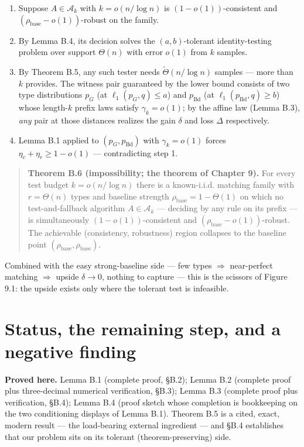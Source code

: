 \begin{enumerate}
\def\labelenumi{\arabic{enumi}.}
\tightlist
\item
  Suppose \(A\in\mathcal A_k\) with \(k=o(n/\log n)\) is
  \((1-o(1))\)-consistent and \((\rho_{\mathrm{base}}-o(1))\)-robust on
  the family.
\item
  By Lemma B.4, its decision solves the \((a,b)\)-tolerant
  identity-testing problem over support \(\Theta(n)\) with error
  \(o(1)\) from \(k\) samples.
\item
  By Theorem B.5, any such tester needs \(\tilde\Theta(n/\log n)\)
  samples --- more than \(k\) provides. The witness pair guaranteed by
  the lower bound consists of two type distributions \(p_G\) (at
  \(\ell_1(p_G,q)\le a\)) and \(p_{\mathrm{Bd}}\) (at
  \(\ell_1(p_{\mathrm{Bd}},q)\ge b\)) whose length-\(k\) prefix laws
  satisfy \(\gamma_k=o(1)\); by the affine law (Lemma B.3), \emph{any}
  pair at those distances realizes the gain \(\delta\) and loss
  \(\Delta\) respectively.
\item
  Lemma B.1 applied to \((p_G,p_{\mathrm{Bd}})\) with \(\gamma_k=o(1)\)
  forces \(\eta_c+\eta_r\ge 1-o(1)\) --- contradicting step 1.
\end{enumerate}

\begin{quote}
\textbf{Theorem B.6 (impossibility; the theorem of Chapter 9).} For
every test budget \(k=o(n/\log n)\) there is a known-i.i.d. matching
family with \(r=\Theta(n)\) types and baseline strength
\(\rho_{\mathrm{base}}=1-\Theta(1)\) on which no test-and-fallback
algorithm \(A\in\mathcal A_k\) --- deciding by any rule on its prefix
--- is simultaneously \((1-o(1))\)-consistent and
\((\rho_{\mathrm{base}}-o(1))\)-robust. The achievable (consistency,
robustness) region collapses to the baseline point
\((\rho_{\mathrm{base}},\rho_{\mathrm{base}})\).
\end{quote}

Combined with the easy strong-baseline side --- few types
\(\Rightarrow\) near-perfect matching \(\Rightarrow\) upside
\(\delta\to0\), nothing to capture --- this is the scissors of Figure
9.1: the upside exists only where the tolerant test is infeasible.

\section{Status, the remaining step, and a negative
finding}

\textbf{Proved here.} Lemma B.1 (complete proof, §B.2); Lemma B.2
(complete proof plus three-decimal numerical verification, §B.3); Lemma
B.3 (complete proof plus verification, §B.4); Lemma B.4 (proof sketch
whose completion is bookkeeping on the two conditioning displays of
Lemma B.1). Theorem B.5 is a cited, exact, modern result --- the
load-bearing external ingredient --- and §B.4 establishes that our
problem sits on its tolerant (theorem-preserving) side.


